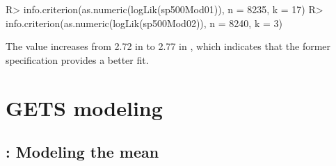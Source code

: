 \documentclass[article,nojss]{jss}
\begin{document}
%
\begin{CodeChunk}
\begin{CodeInput}
R> info.criterion(as.numeric(logLik(sp500Mod01)), n = 8235, k = 17)
R> info.criterion(as.numeric(logLik(sp500Mod02)), n = 8240, k = 3)
\end{CodeInput}
\end{CodeChunk}
%
The value increases from 2.72 in  to 2.77 in , which indicates that the former specification provides a better fit.
\newpage
\section{GETS modeling}
\label{sec:gets:model:selection}

\subsection[getsm: Modeling the mean]{: Modeling the mean}
\label{subsec:getsm:modeling:the:mean}
\end{document}
